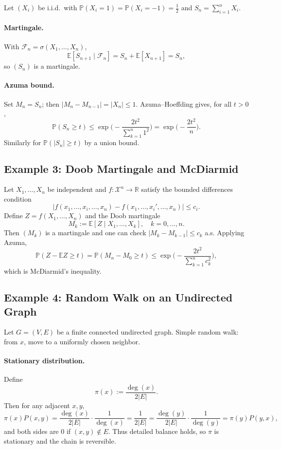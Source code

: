 \documentclass[answers,12pt,addpoints]{exam}
\begin{document}
Let $(X_i)$ be i.i.d.\ with $\mathbb{P}(X_i=1)=\mathbb{P}(X_i=-1)=\tfrac12$ and $S_n=\sum_{i=1}^n X_i$.

\paragraph{Martingale.}
With $\mathcal{F}_n=\sigma(X_1,\dots,X_n)$,
\[
\mathbb{E}[S_{n+1}\mid\mathcal{F}_n] = S_n + \mathbb{E}[X_{n+1}] = S_n,
\]
so $(S_n)$ is a martingale.

\paragraph{Azuma bound.}
Set $M_n = S_n$; then $|M_n - M_{n-1}| = |X_n|\le 1$. Azuma–Hoeffding gives, for all $t>0$,
\[
\mathbb{P}(S_n \ge t) \le \exp\!\Big(-\frac{2t^2}{\sum_{k=1}^n 1^2}\Big)
= \exp\!\Big(-\frac{2t^2}{n}\Big).
\]
Similarly for $\mathbb{P}(|S_n|\ge t)$ by a union bound.


\subsection*{Example 3: Doob Martingale and McDiarmid}

Let $X_1,\dots,X_n$ be independent and $f:\mathcal{X}^n\to\mathbb{R}$ satisfy the bounded differences condition
\[
|f(x_1,\dots,x_i,\dots,x_n)-f(x_1,\dots,x_i',\dots,x_n)|\le c_i.
\]
Define $Z = f(X_1,\dots,X_n)$ and the Doob martingale
\[
M_k := \mathbb{E}[Z \mid X_1,\dots,X_k],\quad k=0,\dots,n.
\]
Then $(M_k)$ is a martingale and one can check $|M_k-M_{k-1}|\le c_k$ a.s. Applying Azuma,
\[
\mathbb{P}(Z - \mathbb{E}Z \ge t)
= \mathbb{P}(M_n - M_0 \ge t)
\le \exp\!\Big(-\frac{2t^2}{\sum_{k=1}^n c_k^2}\Big),
\]
which is McDiarmid's inequality.


\subsection*{Example 4: Random Walk on an Undirected Graph}

Let $G=(V,E)$ be a finite connected undirected graph. Simple random walk: from $x$, move to a uniformly chosen neighbor.

\paragraph{Stationary distribution.}
Define
\[
\pi(x) := \frac{\deg(x)}{2|E|}.
\]
Then for any adjacent $x,y$,
\[
\pi(x)P(x,y) = \frac{\deg(x)}{2|E|}\cdot \frac{1}{\deg(x)} = \frac{1}{2|E|}
= \frac{\deg(y)}{2|E|}\cdot \frac{1}{\deg(y)} = \pi(y)P(y,x),
\]
and both sides are $0$ if $(x,y)\notin E$. Thus detailed balance holds, so $\pi$ is stationary and the chain is reversible.
\end{document}
